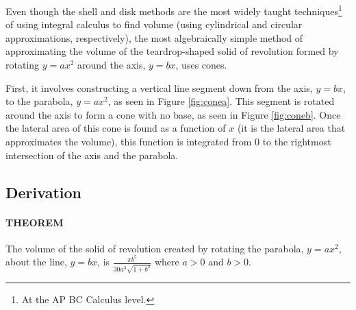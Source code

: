 \documentclass{article}
\begin{document}
Even though the shell and disk methods are the most widely taught techniques\footnote{\label{fot:1}At the AP BC Calculus level.} of using integral calculus to find volume (using cylindrical and circular approximations, respectively), the most algebraically simple method of approximating the volume of the teardrop-shaped solid of revolution formed by rotating $y=ax^2$ around the axis, $y=bx$, uses cones.\par
First, it involves constructing a vertical line segment down from the axis, $y=bx$, to the parabola, $y=ax^2$, as seen in Figure \ref{fig:conea}. This segment is rotated around the axis to form a cone with no base, as seen in Figure \ref{fig:coneb}. Once the lateral area of this cone is found as a function of $x$ (it is the lateral area that approximates the volume), this function is integrated from 0 to the rightmost intersection of the axis and the parabola.

\subsection{Derivation} \label{deriv1}
\paragraph{THEOREM} The volume of the solid of revolution created by rotating the parabola, $y=ax^2$, about the line, $y=bx$, is $\frac{\pi b^5}{30a^3\sqrt{1+b^2}}$ where $a>0$ and $b>0$.\par
\smallskip
\end{document}
